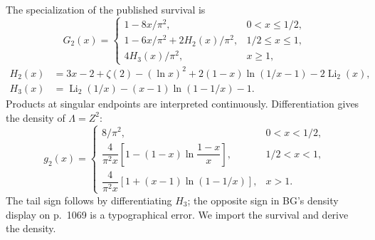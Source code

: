 \documentclass[11pt,a4paper]{article}
\numberwithin{equation}{section}
\theoremstyle{remark}
\begin{document}
The specialization of the published survival is
\begin{equation}\label{eq:G2}
G_2(x)=\begin{cases}
1-8x/\pi^2,&0<x\le1/2,\\
1-6x/\pi^2+2H_2(x)/\pi^2,&1/2\le x\le1,\\
4H_3(x)/\pi^2,&x\ge1,
\end{cases}
\end{equation}
\begin{align*}
H_2(x)&=3x-2+\zeta(2)-(\ln x)^2
+2(1-x)\ln(1/x-1)-2\operatorname{Li}_2(x),\\
H_3(x)&=\operatorname{Li}_2(1/x)-(x-1)\ln(1-1/x)-1.
\end{align*}
Products at singular endpoints are interpreted continuously.
Differentiation gives the density of $\Lambda=Z^2$:
\begin{equation}\label{eq:density}
g_2(x)=\begin{cases}
8/\pi^2,&0<x<1/2,\\
\dfrac4{\pi^2x}\left[1-(1-x)\ln\dfrac{1-x}{x}\right],&1/2<x<1,\\
\dfrac4{\pi^2x}\left[1+(x-1)\ln(1-1/x)\right],&x>1.
\end{cases}
\end{equation}
The tail sign follows by differentiating $H_3$; the opposite sign in
BG's density display on p.~1069 is a typographical error. We import
the survival and derive the density.
\end{document}
